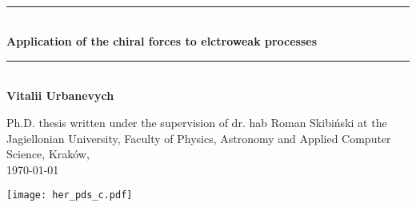 \documentclass[oneside,a4paper,openright]{report}
\newcommand{\HRule}{\rule{\linewidth}{0.5mm}}
\begin{document}
\newpage

\begin{titlepage}
\begin{center}

~\\[5cm]

\HRule \\[0.4cm]
{ 
\huge \bfseries 
Application of the chiral forces to elctroweak processes
\\[0.4cm] 
}
\HRule \\[0.4cm]
{
\LARGE
\bfseries
Vitalii Urbanevych
}
\vfill

{
\large
Ph.D. thesis written under the supervision of dr. hab Roman Skibi\'nski \newline at the Jagiellonian University,
Faculty of Physics, Astronomy \newline and Applied Computer Science, Krak\'ow,
}
\\
{
\large \today
}

\end{center}
\begin{center}
	\texttt{[image: her\_pds\_c.pdf]}
\end{center}
\end{titlepage}

\tableofcontents



%
% 


% 

% 
% 
% 
\end{document}
